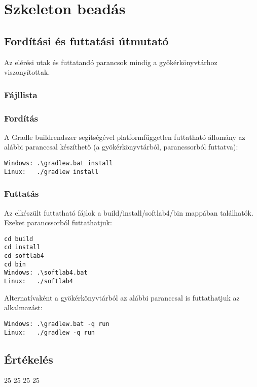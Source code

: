 %
\chapter{Szkeleton beadás}

\thispagestyle{fancy}

\section{Fordítási és futtatási útmutató}
Az elérési utak és futtatandó parancsok mindig a gyökérkönyvtárhoz viszonyítottak.

\subsection{Fájllista}


\subsection{Fordítás}

A Gradle buildrendszer segítségével platformfüggetlen futtatható állomány az alábbi paranccsal készíthető (a gyökérkönyvtárból, parancssorból futtatva):
\lstset{escapeinside=`', xleftmargin=10pt, frame=single, basicstyle=\ttfamily\footnotesize, language=sh}
\begin{lstlisting}
Windows: .\gradlew.bat install
Linux:   ./gradlew install
\end{lstlisting}

\subsection{Futtatás}
Az elkészült futtatható fájlok a build/install/softlab4/bin mappában találhatók. 
Ezeket parancssorból futtathatjuk:
\lstset{escapeinside=`', xleftmargin=10pt, frame=single, basicstyle=\ttfamily\footnotesize, language=sh}
\begin{lstlisting}
cd build
cd install
cd softlab4
cd bin
Windows: .\softlab4.bat 
Linux:   ./softlab4
\end{lstlisting}

Alternatívaként a gyökérkönyvtárból az alábbi paranccsal is futtathatjuk az alkalmazást:
\lstset{escapeinside=`', xleftmargin=10pt, frame=single, basicstyle=\ttfamily\footnotesize, language=sh}
\begin{lstlisting}
Windows: .\gradlew.bat -q run
Linux:   ./gradlew -q run
\end{lstlisting}

\section{Értékelés}

\begin{ertekeles}
{25}        %
{25}
{25}
{25}
\end{ertekeles}

